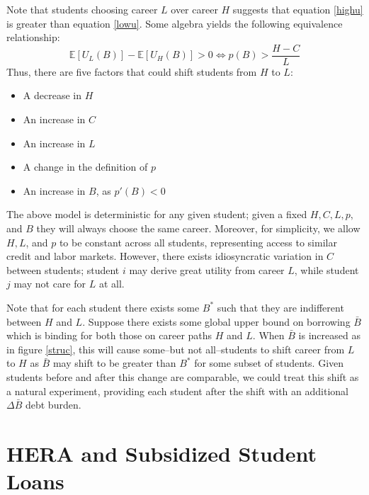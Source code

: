 \documentclass{article}
\begin{document}
	Note that students choosing career $L$ over career $H$ suggests that equation \ref{highu} is greater than equation \ref{lowu}. Some algebra yields the following equivalence relationship: 
	$$\mathbb{E}\left[U_L(B)\right] - \mathbb{E}\left[U_H(B)\right] > 0 \iff p(B) > \frac{H - C}{L} \label{choicecon}$$ 
	Thus, there are five factors that could shift students from $H$ to $L$:
	\begin{itemize}
		\singlespacing
		\item A decrease in $H$
		\item An increase in $C$
		\item An increase in $L$
		\item A change in the definition of $p$
		\item An increase in $B$, as $p'(B) < 0$
	\end{itemize}

	The above model is deterministic for any given student; given a fixed $H, C, L, p,$ and $B$ they will always choose the same career. Moreover, for simplicity, we allow $H, L$, and $p$ to be constant across all students, representing access to similar credit and labor markets. However, there exists idiosyncratic variation in $C$ between students; student $i$ may derive great utility from career $L$, while student $j$ may not care for $L$ at all.

	Note that for each student there exists some $B^*$ such that they are indifferent between $H$ and $L$. Suppose there exists some global upper bound on borrowing $\bar{B}$ which is binding for both those on career paths $H$ and $L$. When $\bar{B}$ is increased as in figure \ref{struc}, this will cause some--but not all--students to shift career from $L$ to $H$ as $\bar{B}$ may shift to be greater than $B^*$ for some subset of students. Given students before and after this change are comparable, we could treat this shift as a natural experiment, providing each student after the shift with an additional $\Delta\bar{B}$ debt burden. 

	\section{HERA and Subsidized Student Loans}
	
\end{document}
